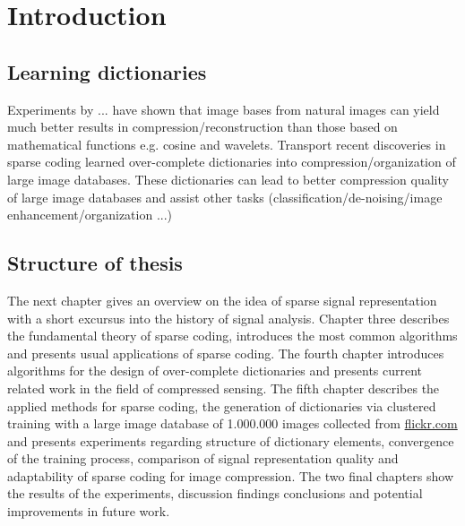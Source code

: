 \chapter{Introduction}
\label{sec:introduction}
\section{Learning dictionaries} %



Experiments by ... have shown that image bases from natural
images can yield much better results in compression/reconstruction than
those based on mathematical functions e.g. cosine and
wavelets.\cite{Elad2006,Mairal2010}
Transport recent discoveries in sparse coding learned over-complete
dictionaries into compression/organization of large image databases.
These dictionaries can lead to better compression quality of large
image databases and assist other tasks (classification/de-noising/image
enhancement/organization ...)


\section{Structure of thesis}
The next chapter gives an overview on the idea of sparse signal
representation with a short excursus into the history of signal analysis.
Chapter 
three describes the fundamental theory of sparse coding, introduces the most
common algorithms and presents usual applications of sparse coding. The fourth
chapter introduces algorithms for the design of over-complete dictionaries and
presents current related work in the field of compressed sensing. The fifth
chapter describes the applied methods for sparse coding, the generation of
dictionaries via clustered training with a large image database of 1.000.000
images collected from \url{flickr.com} and presents experiments regarding
structure of dictionary elements, convergence of the training process,
comparison of signal representation quality and adaptability of sparse coding
for image compression. The two final chapters show the results of the
experiments, discussion findings conclusions and potential improvements in
future work. 

